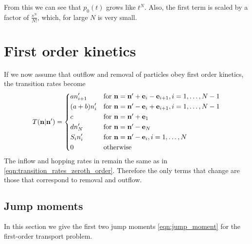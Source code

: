 From this we can see that \(p_0(t)\) grows like \(t^N\). Also, the first term is
scaled by a factor of \(\frac{s^N}{N!}\), which, for large \(N\) is very small.

\section{First order kinetics}
If we now assume that outflow and removal of particles obey first order
kinetics, the transition rates become
\begin{equation}
    \label{eqn:transition_rates_first_order}
    T(\V{n}|\V{n}') =
        \begin{dcases*}
            a n'_{i+1} & for \(\V{n} = \V{n}' + \V{e}_i - \V{e}_{i+1},
            i=1,\dotsc,N-1\)\\
            (a+b) n'_i & for \(\V{n} = \V{n}' - \V{e}_i + \V{e}_{i+1},
            i=1,\dotsc,N-1\)\\
            c & for \(\V{n} = \V{n}' + \V{e}_1\)\\
            d n'_N & for \(\V{n} = \V{n}' - \V{e}_N\)\\
            S_i n'_i & for \(\V{n} = \V{n}' - \V{e}_i, i=1,\dotsc,N\)\\
            0 & otherwise
        \end{dcases*}
\end{equation}
The inflow and hopping rates in remain the same as in
\eqref{eqn:transition_rates_zeroth_order}.
Therefore the only terms that change are those that correspond to removal and
outflow.

\subsection{Jump moments}
In this section we give the first two jump moments \eqref{eqn:jump_moment} for
the first-order transport problem.

